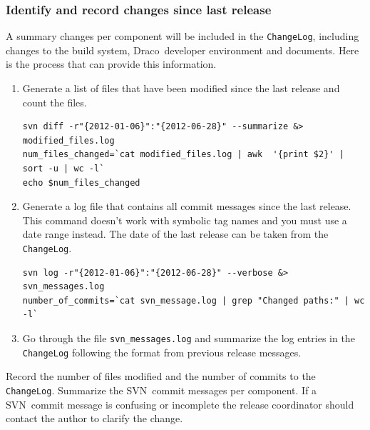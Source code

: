 \documentclass[note]{newmemo}
\newcommand{\draco}{{\normalfont\small\sffamily Draco}}
\newcommand{\cvs}{\textsf{CVS}}
\newcommand{\svn}{\textsf{SVN}}
\begin{document}

\subsubsection{Identify and record changes since last release}
\label{sec:changes_since_lr}

A summary changes per component will be included in the
\texttt{ChangeLog}, including changes to the build system,
\draco\ developer environment and documents.
Here is the process that can provide this information.

\begin{enumerate}
\item Generate a list of files that have been modified since the last release and count the files.
\begin{lstlisting}[basicstyle=\footnotesize, xleftmargin=.5in, 
  xrightmargin=0.5in]
svn diff -r"{2012-01-06}":"{2012-06-28}" --summarize &> modified_files.log
num_files_changed=`cat modified_files.log | awk  '{print $2}' | sort -u | wc -l`
echo $num_files_changed
\end{lstlisting}
\item Generate a log file that contains all commit messages since the last
  release.  This command doesn't work with symbolic tag names and you
  must use a date range instead.  The date of the last release can be
  taken from the \texttt{ChangeLog}.
\begin{lstlisting}[basicstyle=\footnotesize, xleftmargin=0.5in, 
  xrightmargin=0.5in]
svn log -r"{2012-01-06}":"{2012-06-28}" --verbose &> svn_messages.log  
number_of_commits=`cat svn_message.log | grep "Changed paths:" | wc -l`
\end{lstlisting}
\item Go through the file \texttt{svn\_messages.log}
  and summarize the log entries in the \texttt{ChangeLog} following the format from previous release messages.
\end{enumerate}

Record the number of files modified and the number of commits to the
\texttt{ChangeLog}. Summarize the \svn\ commit messages per component.
If a \svn\ commit message is confusing or incomplete the release
coordinator should contact the author to clarify the change.
\end{document}
